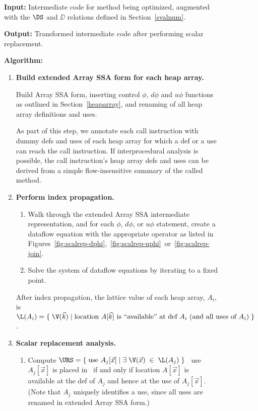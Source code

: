 \begin{figure}
{\small
{\bf Input:} Intermediate code for method being optimized, augmented
with the $\DS$ and $\DD$ relations defined in Section~\ref{svalnum}.

\vspace{14pt}

{\bf Output:} Transformed intermediate code after performing scalar
replacement.

\vspace{14pt}

{\bf Algorithm:}
\begin{enumerate}

\item \label{item:arrayssa}
{\bf Build extended Array SSA form for each heap array.}

Build Array SSA form, inserting control $\phi$,
$d\phi$ and $u\phi$ functions as outlined in Section~\ref{heaparray},
and renaming of all heap array definitions and uses.

As part of this step, we annotate each call instruction with dummy
defs and uses of each heap array for which a def or a use can reach the call
instruction.  
If interprocedural analysis is possible, the call
instruction's heap array defs and uses can
be derived from a simple flow-insensitive
summary of the called method.  

\item \label{item:dflow}
{\bf Perform index propagation.}
\begin{enumerate}
\item Walk through the extended Array SSA intermediate representation,
and for each $\phi$, $d\phi$, or $u\phi$ statement, create a 
dataflow equation with the appropriate operator as listed in 
Figures~\ref{fig:scalrep-dphi},~\ref{fig:scalrep-uphi}~or~\ref{fig:scalrep-join}.
\item Solve the system of dataflow equations by iterating to a fixed point.
\end{enumerate}
After index propagation, the lattice value of each 
heap array, $A_i$,
is 
$\L(A_i) = \{\; \V(\vec{k}) \; | \;
\mbox{location $A[\vec{k}]$ is ``available'' at def $A_i$ (and all uses of $A_i$)} \; \}$.

\item \label{item:analysis}
{\bf Scalar replacement analysis.}

\begin{enumerate}
\item Compute $\URS = \{\; \mbox{use $A_j[\vec{x}]$} \; | \; \exists\; \V(\vec{x}) \; \in \; \L(A_j)\;\}$ \ie\
use $A_j[\vec{x}]$ is placed in \URS\ if and only if location $A[\vec{x}]$ is available
at the def of $A_j$ and hence at the use of $A_j[\vec{x}]$.
(Note that $A_j$ uniquely identifies a use, since all uses are renamed in
extended Array SSA form.)


\end{enumerate}
\end{enumerate}}
\end{figure}
